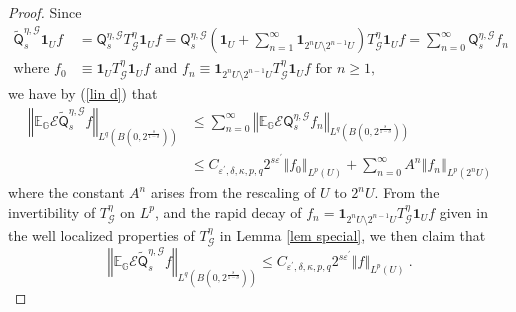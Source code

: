 \documentclass{amsart}%
\theoremstyle{plain}
\numberwithin{equation}{section}
\begin{document}
\begin{proof}
Since
\begin{align*}
\widetilde{\mathsf{Q}}_{s}^{\eta,\mathcal{G}}\mathbf{1}_{U}f  & =\mathsf{Q}%
_{s}^{\eta,\mathcal{G}}T_{\mathcal{G}}^{\eta}\mathbf{1}_{U}f=\mathsf{Q}%
_{s}^{\eta,\mathcal{G}}\left(  \mathbf{1}_{U}+\sum_{n=1}^{\infty}%
\mathbf{1}_{2^{n}U\setminus2^{n-1}U}\right)  T_{\mathcal{G}}^{\eta}%
\mathbf{1}_{U}f=\sum_{n=0}^{\infty}\mathsf{Q}_{s}^{\eta,\mathcal{G}}f_{n}\\
\text{where }f_{0}  & \equiv\mathbf{1}_{U}T_{\mathcal{G}}^{\eta}\mathbf{1}%
_{U}f\text{ and }f_{n}\equiv\mathbf{1}_{2^{n}U\setminus2^{n-1}U}%
T_{\mathcal{G}}^{\eta}\mathbf{1}_{U}f\text{ for }n\geq1,
\end{align*}
we have by (\ref{lin d}) that%
\begin{align*}
\left\Vert \mathbb{E}_{\mathbb{G}}\mathcal{E}\widetilde{\mathsf{Q}}_{s}%
^{\eta,\mathcal{G}}f\right\Vert _{L^{q}\left(  B\left(  0,2^{\frac{s}%
{1-\delta}}\right)  \right)  }  & \leq\sum_{n=0}^{\infty}\left\Vert
\mathbb{E}_{\mathbb{G}}\mathcal{E}\mathsf{Q}_{s}^{\eta,\mathcal{G}}%
f_{n}\right\Vert _{L^{q}\left(  B\left(  0,2^{\frac{s}{1-\delta}}\right)
\right)  }\\
& \leq C_{\varepsilon^{\prime},\delta,\kappa,p,q}2^{s\varepsilon^{\prime}%
}\left\Vert f_{0}\right\Vert _{L^{p}\left(  U\right)  }+\sum_{n=0}^{\infty
}A^{n}\left\Vert f_{n}\right\Vert _{L^{p}\left(  2^{n}U\right)  }%
\end{align*}
where the constant $A^{n}$ arises from the rescaling of $U$ to $2^{n}U$. From
the invertibility of $T_{\mathcal{G}}^{\eta}$ on $L^{p}$, and the rapid decay
of $f_{n}=\mathbf{1}_{2^{n}U\setminus2^{n-1}U}T_{\mathcal{G}}^{\eta}%
\mathbf{1}_{U}f$ given in the well localized properties of $T_{\mathcal{G}%
}^{\eta}$ in Lemma \ref{lem special}, we then claim that%
\[
\left\Vert \mathbb{E}_{\mathbb{G}}\mathcal{E}\widetilde{\mathsf{Q}}_{s}%
^{\eta,\mathcal{G}}f\right\Vert _{L^{q}\left(  B\left(  0,2^{\frac{s}%
{1-\delta}}\right)  \right)  }\leq C_{\varepsilon^{\prime},\delta,\kappa
,p,q}2^{s\varepsilon^{\prime}}\left\Vert f\right\Vert _{L^{p}\left(  U\right)
}\ .
\]



\end{proof}
\end{document}

